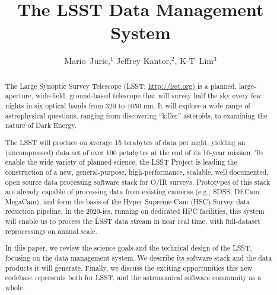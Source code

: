 \documentclass[11pt,twoside]{article}
\begin{document}
\title{The LSST Data Management System}
\author{Mario~Juric,$^1$ Jeffrey Kantor,$^2$, K-T~Lim$^3$
}


\begin{abstract}

The Large Synoptic Survey Telescope (LSST; \url{http://lsst.org}) is a planned,
large-aperture, wide-field, ground-based telescope that will survey half the
sky every few nights in six optical bands from 320 to 1050 nm.  It will
explore a wide range of astrophysical questions, ranging from discovering
``killer'' asteroids, to examining the nature of Dark Energy.

The LSST will produce on average 15 terabytes of data per night, yielding an
(uncompressed) data set of over 100 petabytes at the end of its 10-year
mission.  To enable the wide variety of planned science, the LSST Project is
leading the construction of a new, general-purpose, high-performance,
scalable, well documented, open source data processing software stack for
O/IR surveys.  Prototypes of this stack are already capable of processing
data from existing cameras (e.g., SDSS, DECam, MegaCam), and form the basis
of the Hyper Supreme-Cam (HSC) Survey data reduction pipeline.  In the
2020-ies, running on dedicated HPC facilities, this system will enable us to
process the LSST data stream in near real time, with full-dataset
reprocessings on annual scale.

In this paper, we review the science goals and the technical design of the
LSST, focusing on the data management system. We describe its software
stack and the data products it will generate. Finally, we discuss the 
exciting opportunities this new codebase represents both for LSST,
and the astronomical software community as a whole.

\end{abstract}
\end{document}
